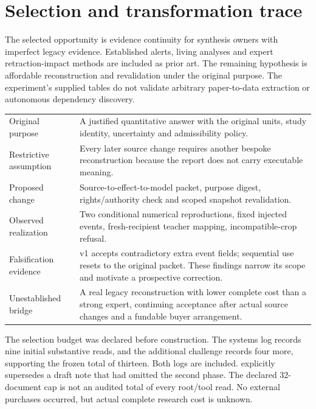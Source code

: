 \documentclass[10 pt]{article}
\begin{document}
\section{Selection and transformation trace}

The selected opportunity is evidence continuity for synthesis owners with imperfect legacy evidence. Established alerts, living analyses and expert retraction-impact methods are included as prior art. The remaining hypothesis is affordable reconstruction and revalidation under the original purpose. The experiment's supplied tables do not validate arbitrary paper-to-data extraction or autonomous dependency discovery.

\begin{tabularx}{\textwidth}{p{}Y}
\toprule
Original purpose &A justified quantitative answer with the original units, study identity, uncertainty and admissibility policy.\\
Restrictive assumption &Every later source change requires another bespoke reconstruction because the report does not carry executable meaning.\\
Proposed change &Source-to-effect-to-model packet, purpose digest, rights/authority check and scoped snapshot revalidation.\\
Observed realization &Two conditional numerical reproductions, fixed injected events, fresh-recipient teacher mapping, incompatible-crop refusal.\\
Falsification evidence &v1 accepts contradictory extra event fields; sequential use resets to the original packet. These findings narrow its scope and motivate a prospective correction.\\
Unestablished bridge &A real legacy reconstruction with lower complete cost than a strong expert, continuing acceptance after actual source changes and a fundable buyer arrangement.\\
\bottomrule
\end{tabularx}

The selection budget was declared before construction. The systems log records nine initial substantive reads, and the additional challenge records four more, supporting the frozen total of thirteen. Both logs are included.  explicitly supersedes a draft note that had omitted the second phase. The declared 32-document cap is not an audited total of every root/tool read. No external purchases occurred, but actual complete research cost is unknown.
\end{document}
